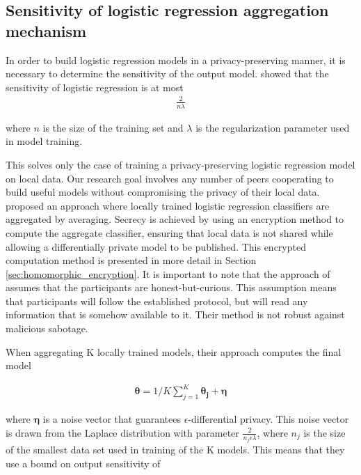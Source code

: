 \subsection{Sensitivity of logistic regression aggregation mechanism} \label{sec:Sensitivity_of_LogReg}

In order to build logistic regression models in a privacy-preserving manner, it is necessary to determine the sensitivity of the output model. \cite{chaudhuri2009logistic} showed that the sensitivity of logistic regression is at most 
\begin{eqnarray}\label{eq:logres_sensitivity}
\frac{2}{n\lambda}
\end{eqnarray}

where $n$ is the size of the training set and $\lambda$ is the regularization parameter used in model training.

This solves only the case of training a privacy-preserving logistic regression model on local data. Our research goal involves any number of peers cooperating to build useful models without compromising the privacy of their local data. \cite{pathak2010diffprivhomo} proposed an approach where locally trained logistic regression classifiers are aggregated by averaging. Secrecy is achieved by using an encryption method to compute the aggregate classifier, ensuring that local data is not shared while allowing a differentially private model to be published. This encrypted computation method is presented in more detail in Section \ref{sec:homomorphic_encryption}. It is important to note that the approach of \cite{pathak2010diffprivhomo} assumes that the participants are honest-but-curious. This assumption means that participants will follow the established protocol, but will read any information that is somehow available to it. Their method is not robust against malicious sabotage. 

When aggregating K locally trained models, their approach computes the final model

\begin{eqnarray}
\label{eq:parametric_aggregation}
\boldsymbol{\theta} = 1/K\sum_{j=1}^{K} \boldsymbol{\theta_j} + \boldsymbol{\eta}
\end{eqnarray}


where $\boldsymbol{\eta}$ is a noise vector that guarantees $\epsilon$-differential privacy. This noise vector is drawn from the Laplace distribution with parameter $\frac{2}{n_j\epsilon\lambda}$, where $n_j$ is the size of the smallest data set used in training of the K models. This means that they use a bound on output sensitivity of 

